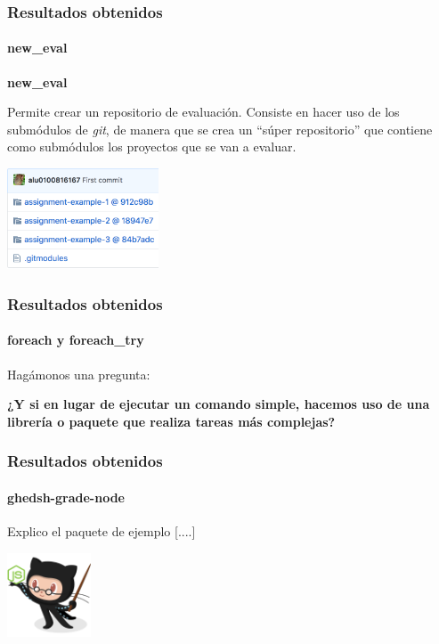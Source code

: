 \documentclass{beamer}
\begin{document}
\begin{frame}
  \frametitle{Resultados obtenidos}
  \framesubtitle{new\_eval}
  \textbf{new\_eval}
  \bigskip

  Permite crear un repositorio de evaluación. Consiste en hacer uso de los submódulos de {\it git},
  de manera que se crea un ``súper repositorio'' que contiene como submódulos los proyectos que se van a evaluar.
  \bigskip

  \centering
  \includegraphics[height=3cm, width=4.5cm]{img/eval-preview.png}

\end{frame}


\begin{frame}[fragile]
  \frametitle{Resultados obtenidos}
  \framesubtitle{foreach y foreach\_try}
  
  Hagámonos una pregunta:
  \bigskip

  \textbf{¿Y si en lugar de ejecutar un comando simple, hacemos uso de una librería o paquete que realiza tareas más complejas?}

\end{frame}

\begin{frame}[fragile]
  \frametitle{Resultados obtenidos}
  \framesubtitle{ghedsh-grade-node}
  
  Explico el paquete de ejemplo [....]

  \centering
  \includegraphics[height=2.5cm, width=2.5cm]{img/ghedsh-grade-node.png}

\end{frame}
  
\end{document}
